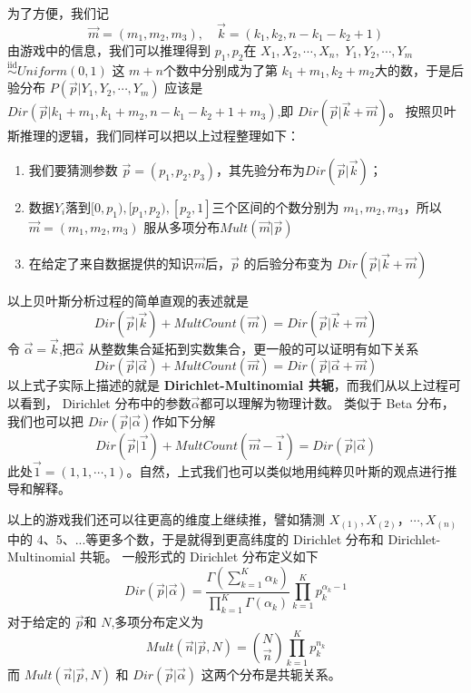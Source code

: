 为了方便，我们记
$$ \vec{m}=(m_1,m_2,m_3),\quad \vec{k}=(k_1,k_2,n-k_1-k_2+1) $$
由游戏中的信息，我们可以推理得到 $p_1, p_2$在
$X_1,X_2,\cdots,X_n,$ $Y_1,Y_2,\cdots,Y_m$
${\stackrel{\mathrm{iid}}{\sim}} Uniform(0,1)$
这 $m+n$个数中分别成为了第 $k_1+m_1, k_2+m_2$大的数，于是后验分布 $P(\vec{p}|Y_1,Y_2,\cdots,Y_m)$
应该是 $Dir(\vec{p}|k_1+m_1,k_1+m_2,n-k_1-k_2+1+m_3)$,即
$Dir(\vec{p}|\vec{k}+\vec{m})$。
按照贝叶斯推理的逻辑，我们同样可以把以上过程整理如下：
\begin{enumerate}
\item 我们要猜测参数 $\vec{p}=(p_1,p_2,p_3)$，其先验分布为$Dir(\vec{p}|\vec{k})$；
\item 数据$Y_i$落到$[0,p_1), [p_1,p_2),[p_2,1]$三个区间的个数分别为 $m_1,m_2,m_3$，所以
$\vec{m}=(m_1,m_2,m_3)$ 服从多项分布$Mult(\vec{m}|\vec{p})$
\item 在给定了来自数据提供的知识$\vec{m}$后，$\vec{p}$ 的后验分布变为 $Dir(\vec{p}|\vec{k}+\vec{m})$
\end{enumerate}
以上贝叶斯分析过程的简单直观的表述就是
$$ Dir(\vec{p}|\vec{k}) + MultCount(\vec{m}) = Dir(\vec{p}|\vec{k}+\vec{m}) $$
令 $\vec{\alpha}=\vec{k}$,把$\vec{\alpha}$
从整数集合延拓到实数集合，更一般的可以证明有如下关系
\begin{equation}
 Dir(\vec{p}|\vec{\alpha}) + MultCount(\vec{m})
 = Dir(\vec{p}|\vec{\alpha}+\vec{m})
\end{equation}
以上式子实际上描述的就是 {\bf Dirichlet-Multinomial 共轭}，而我们从以上过程可以看到，
Dirichlet 分布中的参数$\vec{\alpha}$都可以理解为物理计数。
类似于 Beta 分布，我们也可以把 $Dir(\vec{p}|\vec{\alpha})$作如下分解
$$ Dir(\vec{p}|\vec{1}) + MultCount(\vec{m}-\vec{1})
= Dir(\vec{p}|\vec{\alpha}) $$
此处$\vec{1}=(1,1,\cdots,1)$。自然，上式我们也可以类似地用纯粹贝叶斯的观点进行推导和解释。

以上的游戏我们还可以往更高的维度上继续推，譬如猜测 $X_{(1)},X_{(2)}，\cdots, X_{(n)}$ 中的
4、5、...等更多个数，于是就得到更高纬度的 Dirichlet 分布和 Dirichlet-Multinomial 共轭。
一般形式的 Dirichlet 分布定义如下
\begin{equation}
\displaystyle Dir(\vec{p}|\vec{\alpha}) =
\displaystyle \frac{\Gamma(\sum_{k=1}^K\alpha_k)}
{\prod_{k=1}^K\Gamma(\alpha_k)} \prod_{k=1}^K p_k^{\alpha_k-1}
\end{equation}
对于给定的 $\vec{p}$和 $N$,多项分布定义为
\begin{equation}
\displaystyle  Mult(\vec{n} |\vec{p},N) = \binom{N}{\vec{n}}\prod_{k=1}^K p_k^{n_k}
\end{equation}
而 $Mult(\vec{n} |\vec{p},N)$ 和 $Dir(\vec{p}|\vec{\alpha})$
这两个分布是共轭关系。

